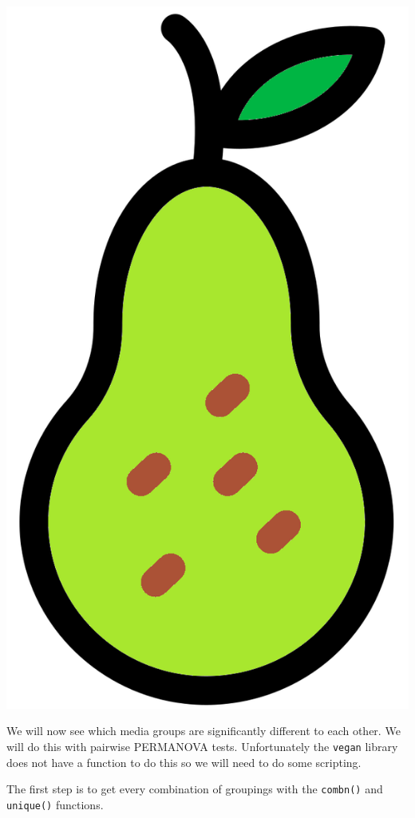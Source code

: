 \documentclass[
]{book}
\newenvironment{Shaded}{\begin{snugshade}}{\end{snugshade}}
\newcommand{\AttributeTok}[1]{\textcolor[rgb]{0.13,0.29,0.53}{#1}}
\newcommand{\CommentTok}[1]{\textcolor[rgb]{0.56,0.35,0.01}{\textit{#1}}}
\newcommand{\DecValTok}[1]{\textcolor[rgb]{0.00,0.00,0.81}{#1}}
\newcommand{\FunctionTok}[1]{\textcolor[rgb]{0.13,0.29,0.53}{\textbf{#1}}}
\newcommand{\NormalTok}[1]{#1}
\newcommand{\OtherTok}[1]{\textcolor[rgb]{0.56,0.35,0.01}{#1}}
\newcommand{\SpecialCharTok}[1]{\textcolor[rgb]{0.81,0.36,0.00}{\textbf{#1}}}
\begin{document}
\includegraphics{figures/pear.png}

We will now see which media groups are significantly different to each other.
We will do this with pairwise PERMANOVA tests.
Unfortunately the \texttt{vegan} library does not have a function to do this so we will need to do some scripting.

The first step is to get every combination of groupings with the \texttt{combn()} and \texttt{unique()} functions.

\begin{Shaded}
\end{Shaded}
\end{document}
